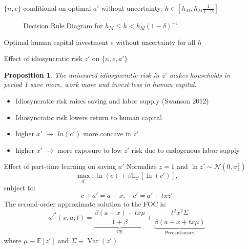 \documentclass[serif, aspectratio=169]{beamer}
\theoremstyle{remark}
\theoremstyle{plain}
\newtheorem{proposition}[theorem]{Proposition}
\begin{document}
\begin{frame}[label=decision]{$\{n,e\}$ conditional on optimal $a'$ without uncertainty: $h\in[h_M,h_M\frac{1}{1-\delta}]$}
\begin{figure}
    \centering
    

\caption{Decision Rule Diagram for $h_M \leq h<h_M(1-\delta)^{-1}$}
   
\label{fig:rule-diagram}
\end{figure}

\end{frame}
\begin{frame}[label=HCrule]{Optimal human capital investment $e$ without uncertainty for all $h$}
\begin{figure}
    \centering
    


\label{fig:e-digram}
\end{figure}
    
\end{frame}

\begin{frame}{Effect of idiosyncratic risk $z'$ on $\{n,e,a'\}$}
\begin{proposition}
    The uninsured idiosyncratic risk in $z'$ makes households in period 1 save more, work more and invest less in human capital.
\end{proposition}
\begin{itemize}
    \item Idiosyncratic risk raises saving and labor supply (Swanson 2012)
    \item Idiosyncratic risk lowers return to human capital
    \item[-] higher $x'$ $\rightarrow$ $ln(c')$ more concave in $z'$
    \item[-] higher $x'$ $\rightarrow$ more exposure to low $z'$ risk due to endogenous labor supply
    
\end{itemize}

\end{frame}

\begin{frame}{Effect of part-time learning on saving $a'$}
Normalize $z=1$ and $\ln z' \sim \mathcal{N}(0,\sigma_z^2)$
\begin{equation*}\label{eq:savingprob}
\max_{a'} : \ln(c) + \beta \mathbb{E}_{z'}[\ln(c')],
\end{equation*}
subject to:
\begin{equation}
c + a' = a + x , \quad c' = a' + txz'
\end{equation}
The second-order approximate solution to the FOC is:
\begin{equation}
a'^*(x,a;t) = \underbrace{\frac{\beta(a+x) - tx\mu}{1+\beta}}_{\text{CE}} + \underbrace{\frac{t^2x^2\Sigma}{\beta(a+x + tx\mu)}}_{\text{Precautionary}}
\end{equation}
where $\mu\equiv \mathbb{E}[z']$ and $\Sigma \equiv\operatorname{Var}(z')$


\end{frame}
\end{document}
